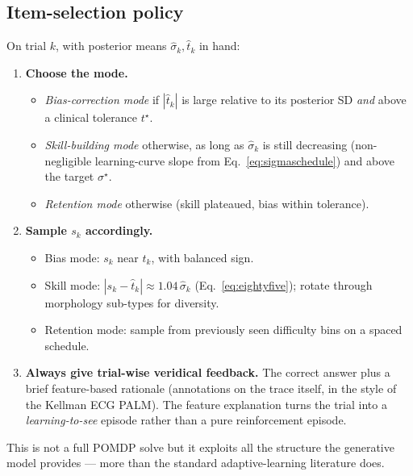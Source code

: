 \documentclass[11pt]{article}
\begin{document}
\subsection{Item-selection policy}
\label{sec:policy}
On trial $k$, with posterior means $\hat\sigma_k, \hat t_k$ in hand:

\begin{enumerate}[leftmargin=*,itemsep=2pt]
  \item \textbf{Choose the mode.}
    \begin{itemize}[leftmargin=*,itemsep=1pt]
      \item \emph{Bias-correction mode} if $|\hat t_k|$ is large
            relative to its posterior SD \emph{and} above a clinical
            tolerance $t^\star$.
      \item \emph{Skill-building mode} otherwise, as long as
            $\hat\sigma_k$ is still decreasing (non-negligible
            learning-curve slope from Eq.~\ref{eq:sigmaschedule}) and
            above the target $\sigma^\star$.
      \item \emph{Retention mode} otherwise (skill plateaued, bias
            within tolerance).
    \end{itemize}
  \item \textbf{Sample $s_k$ accordingly.}
    \begin{itemize}[leftmargin=*,itemsep=1pt]
      \item Bias mode: $s_k$ near $\hat t_k$, with balanced sign.
      \item Skill mode: $|s_k - \hat t_k| \approx 1.04\,\hat\sigma_k$
            (Eq.~\ref{eq:eightyfive}); rotate through morphology
            sub-types for diversity.
      \item Retention mode: sample from previously seen difficulty
            bins on a spaced schedule.
    \end{itemize}
  \item \textbf{Always give trial-wise veridical feedback.} The
        correct answer plus a brief feature-based rationale
        (annotations on the trace itself, in the style of the Kellman
        ECG PALM). The feature explanation turns the trial into a
        \emph{learning-to-see} episode rather than a pure
        reinforcement episode.
\end{enumerate}

This is not a full POMDP solve but it exploits all the structure the
generative model provides — more than the standard adaptive-learning
literature does.
\end{document}
